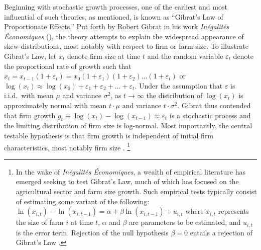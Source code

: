 \documentclass[english]{article}
\begin{document}
Beginning with stochastic growth processes, one of the earliest and most 
influential of such theories, as mentioned, is known as ``Gibrat's Law of 
Proportionate Effects.'' 
Put forth by Robert Gibrat in his work 
\emph{In\'{e}galit\'{e}s \'{E}conomiques} (\citeyear{gibrat1931}), 
the theory attempts to explain the widespread appearance of skew 
distributions, most notably with respect to firm or farm size.
To illustrate Gibrat's Law, let $x_t$ denote firm size at time $t$ and the 
random variable $\varepsilon_t$ denote the proportional rate of growth such 
that $x_t = x_{t-1}(1 + \varepsilon_t) = x_{0}(1 + \varepsilon_1)(1 + 
\varepsilon_2) \ldots (1 + \varepsilon_t)$ or $\log(x_t) \approx \log(x_{0}) 
+ \varepsilon_1 + \varepsilon_2 + \ldots + \varepsilon_t$. 
Under the assumption that $\varepsilon$ is i.i.d.\ with mean $\mu$ and 
variance $\sigma^2$, as $t \to \infty$ the distribution of $\log(x_t)$ is 
approximately normal with mean $t \cdot \mu $ and variance 
$t \cdot \sigma^2$. 
Gibrat thus contended that firm growth $g_t \equiv \log(x_t) - \log(x_{t-1}) 
\approx \varepsilon_t$ is a stochastic process and the limiting distribution of 
firm size is log-normal.
Most importantly, the central testable hypothesis is that firm growth is 
independent of initial firm characteristics, most notably firm size 
\citep{sutton1997}.%
\footnote{In the wake of \emph{In\'{e}galit\'{e}s \'{E}conomiques}, 
a wealth of empirical literature has emerged seeking to test Gibrat's Law, 
much of which has focused on the agricultural sector and farm size growth. 
Such empirical tests typically consist of estimating some variant of the 
following: $\ln(x_{i,t}) - \ln(x_{i,t-1}) = \alpha + \beta \ln(x_{i,t-1}) + 
u_{i,t}$ where $x_{i,t}$ represents the size of farm $i$ at time $t$, $\alpha$ 
and $\beta$ are parameters to be estimated, and $u_{i,t}$ is the error term. 
Rejection of the null hypothesis $\beta=0$ entails a rejection of Gibrat's Law \citep{weiss1999}.} 
\end{document}
